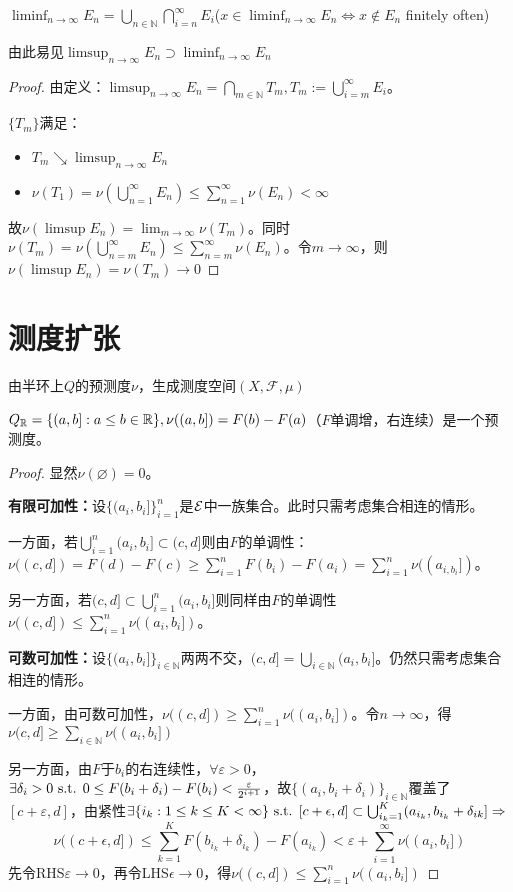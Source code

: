 \documentclass{ctexbook}
\begin{document}
$\liminf_{n\to\infty} E_{n}=\bigcup_{n\in\mathbb{N}}\bigcap_{i=n}^{\infty} E_{i}$($x\in\liminf_{n\to\infty}E_{n}\Leftrightarrow x\not\in E_{n}$ finitely often)

由此易见$\limsup_{n\to\infty}E_{n}\supset\liminf_{n\to\infty}E_{n}$

\begin{proof}
  由定义：$\limsup_{n\to\infty} E_{n}=\bigcap_{m\in\mathbb{N}}T_{m},T_{m}:=\bigcup_{i=m}^{\infty}E_{i}$。

  $\{T_{m}\}$满足：
  \begin{itemize}
  \item $T_{m}\searrow \limsup_{n\to\infty} E_{n}$
  \item $\nu(T_{1})=\nu(\bigcup_{n=1}^\infty E_{n})\leq \sum_{n=1}^{\infty}\nu(E_{n})<\infty$
  \end{itemize}
  故$\nu(\limsup E_{n})=\lim_{m\to\infty}\nu(T_{m})$。同时$\nu(T_{m})=\nu(\bigcup_{n=m}^{\infty}E_{n})\leq \sum_{n=m}^{\infty}\nu(E_{n})$。令$m\to\infty$，则$\nu(\limsup E_{n})=\nu(T_{m})\to 0$
\end{proof}

\section{测度扩张}

由半环上$Q$的预测度$\nu$，生成测度空间$(X,\mathscr{F},\mu)$
\begin{Eg}
  $Q_{\mathbb{R}}=\{(a,b]:a\leq b\in\mathbb{R}\},\nu((a,b])=F(b)-F(a)$（$F$单调增，右连续）是一个预测度。
\end{Eg}
\begin{proof}
显然$\nu(\varnothing)=0$。

\textbf{有限可加性：}设$\{(a_{i},b_{i}]\}_{i=1}^{n}$是$\mathcal{E}$中一族集合。此时只需考虑集合相连的情形。

一方面，若$\bigcup_{i=1}^{n}(a_{i},b_{i}]\subset (c,d]$则由$F$的单调性：$\nu((c,d])=F(d)-F(c)\geq\sum_{i=1}^{n}F(b_{i})-F(a_{i})=\sum_{i=1}^{n}\nu((a_{i,b_{i}}])$。

另一方面，若$(c,d]\subset \bigcup_{i=1}^{n}(a_{i},b_{i}]$则同样由$F$的单调性$ \nu((c,d])\leq \sum_{i=1}^{n}\nu((a_{i},b_{i}])$。

\textbf{可数可加性：}设$\{(a_{i},b_{i}]\}_{i\in\mathbb{N}}$两两不交，$(c,d]=\bigcup_{i\in\mathbb{N}}(a_{i},b_{i}]$。仍然只需考虑集合相连的情形。

一方面，由可数可加性，$\nu((c,d])\geq \sum_{i=1}^{n}\nu((a_{i},b_{i}])$。令$n\to\infty$，得$\nu(c,d]\geq\sum_{i\in\mathbb{N}}\nu((a_{i},b_{i}])$

另一方面，由$F$于$b_{i}$的右连续性，$\forall\varepsilon>0$，$\exists \delta_{i}>0\text{ s.t. } 0\leq F(b_{i}+\delta_{i})-F(b_{i})<\frac{\varepsilon}{2^{i+1}}$，故$\{(a_{i},b_{i}+\delta_{i})\}_{i\in\mathbb{N}}$覆盖了$[c+\varepsilon,d]$，由紧性$\exists \{i_{k}:1\leq k\leq K<\infty\}\text{ s.t. } [c+\epsilon,d]\subset \bigcup_{i_{k}=1}^{K}(a_{i_{k}},b_{i_{k}}+\delta_{ik}]\Rightarrow$
\[\nu((c+\epsilon,d])\leq \sum_{k=1}^{K}F(b_{i_{k}}+\delta_{i_{k}})-F(a_{i_{k}})<\varepsilon+\sum_{i=1}^{\infty}\nu((a_{i},b_{i}])\]
先令RHS$\varepsilon\to 0$，再令LHS$\epsilon\to 0$，得$\nu((c,d])\leq \sum_{i=1}^{n}\nu((a_{i},b_{i}])$
\end{proof}
\end{document}
